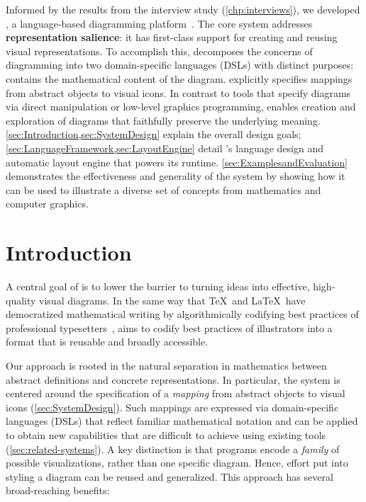 Informed by the results from the interview study (\cref{chp:interviews}), we developed \Penrose, a language-based diagramming platform~\cite{penrose}. The core \Penrose system addresses \textbf{representation salience}: it has first-class support for creating and reusing visual representations. To accomplish this, \Penrose decomposes the concerns of diagramming into two domain-specific languages (DSLs) with distinct purposes: \Substance contains the mathematical content of the diagram. \Style explicitly specifies mappings from abstract objects to visual icons. In contrast to tools that specify diagrams via direct manipulation or low-level graphics programming, \Penrose{} enables creation and exploration of diagrams that faithfully preserve the underlying meaning. \cref{sec:Introduction,sec:SystemDesign} explain the overall design goals; \cref{sec:LanguageFramework,sec:LayoutEngine} detail \Penrose{}'s language design and automatic layout engine that powers its runtime. \cref{sec:ExamplesandEvaluation} demonstrates the effectiveness and generality of the system by showing how it can be used to illustrate a diverse set of concepts from mathematics and computer graphics.

\section{Introduction}
\label{sec:Introduction}

A central goal of \Penrose{} is to lower the barrier to turning ideas into effective, high-quality visual diagrams.  In the same way that \TeX\ and \LaTeX\ have democratized mathematical writing by algorithmically codifying best practices of professional typesetters~\cite{Beeton:2016:CMT}, \Penrose{} aims to codify best practices of illustrators into a format that is reusable and broadly accessible.

Our approach is rooted in the natural separation in mathematics between abstract definitions and concrete representations. In particular, the \Penrose{} system is centered around the specification of a \emph{mapping} from abstract objects to visual icons (\cref{sec:SystemDesign}).  Such mappings are expressed via domain-specific languages (DSLs) that reflect familiar mathematical notation and can be applied to obtain new capabilities that are difficult to achieve using existing tools (\cref{sec:related-systems}).  A key distinction is that \Penrose{} programs encode a \emph{family} of possible visualizations, rather than one specific diagram. Hence, effort put into styling a diagram can be reused and generalized. This approach has several broad-reaching benefits:

